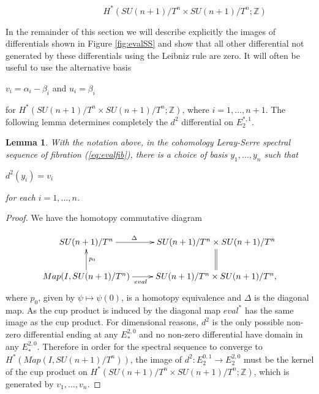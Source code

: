\documentclass{article}
\theoremstyle{plain}
\newtheorem{lem}[thm]{Lemma}
\theoremstyle{definition}
\numberwithin{thm}{section}
\begin{document}
				\begin{center}
					$\;\;\;\;\;\;\;\;\;\;\;\;\;\;\;\;\;\;\;\;\;\;\;\;\;\;\;\;\;\;\;\;\;\;\;\;\;\;\;\;\; H^{*}(SU(n+1)/T^n\times SU(n+1)/T^n;\mathbb{Z})$
				\end{center}
				\begin{center}
				\end{center}
			
				In the remainder of this section we will describe explicitly the images of differentials shown in Figure \ref{fig:evalSS}
				and show that all other differential not generated by these differentials using the Leibniz rule are zero.
				It will often be useful to use the alternative basis
				\begin{center}
					$v_i=\alpha_i-\beta_i$ and $u_i=\beta_i$
				\end{center}
				for $H^{*}(SU(n+1)/T^n\times SU(n+1)/T^n;\mathbb{Z})$, where $i=1,\dots,n+1$. 
				The following lemma determines completely the $d^2$ differential on $E_2^{*,1}$.	
			
				\begin{lem}\label{lem:E^2_{*,1}d^2}
					With the notation above, in the cohomology Leray-Serre spectral sequence of fibration (\ref{eq:evalfib}),
					there is a choice of basis $y_1,\dots,y_n$ such that
					\begin{center}
							$d^2(y_i)=v_i$
					\end{center}
					for each $i=1,\dots,n$.
				\end{lem}
				
				\begin{proof}
					We have the homotopy commutative diagram
					
					\begin{equation*}\label{fig:evalcd}
						\xymatrix{
							{SU(n+1)/T^n} \ar[r]^(.37){\Delta}								   & {SU(n+1)/T^n\times SU(n+1)/T^n} \ar@{=}[d] \\
							{Map(I,SU(n+1)/T^n)} \ar[r]_(.42){eval} \ar[u]_{p_0} & {SU(n+1)/T^n\times SU(n+1)/T^n} ,}
					\end{equation*}
					where $p_0$, given by $\psi \mapsto \psi(0)$, is a homotopy equivalence and $\Delta$ is the diagonal map.
					As the cup product is induced by the diagonal map $eval^*$ has the same image as the cup product.
					For dimensional reasons, $d^2$ is the only possible non-zero differential ending at any $E_*^{2,0}$ and no non-zero differential have domain in any $E_*^{2,0}$.
					Therefore in order for the spectral sequence to converge to $H^{*}(Map(I,SU(n+1)/T^n))$,
					the image of $d^2 \colon E_2^{0,1} \to E_2^{2,0}$ must be the kernel of the cup product on $H^*(SU(n+1)/T^n\times SU(n+1)/T^n;\mathbb{Z})$, 
					which is generated by $v_1,\dots,v_n$.
				\end{proof}
				
\end{document}
